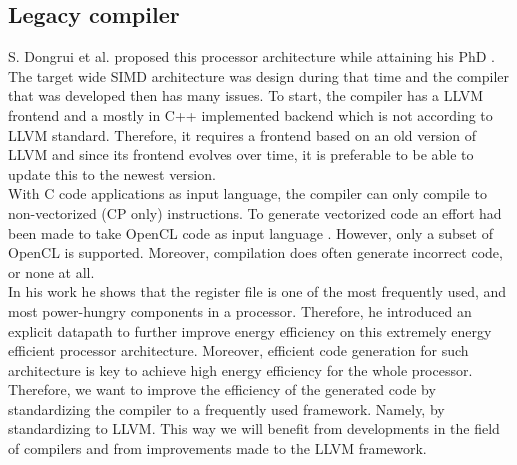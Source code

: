 

\subsection{Legacy compiler}\label{sec:legacy_comp}
S. Dongrui et al. proposed this processor architecture while attaining his PhD \cite{simd}. The target wide SIMD architecture was design during that time and the compiler that was developed then has many issues. To start, the compiler has a LLVM frontend and a mostly in C++ implemented backend which is not according to LLVM standard. Therefore, it requires a frontend based on an old version of LLVM and since its frontend evolves over time, it is preferable to be able to update this to the newest version. \\

With C code applications as input language, the compiler can only compile to non-vectorized (CP only) instructions. To generate vectorized code an effort had been made to take OpenCL code as input language \cite{dongrio2}. However, only a subset of OpenCL is supported. Moreover, compilation does often generate incorrect code, or none at all. \\


In his work he shows that the register file is one of the most frequently used, and most power-hungry components in a processor. Therefore, he introduced an explicit datapath to further improve energy efficiency on this extremely energy efficient processor architecture. Moreover, efficient code generation for such architecture is key to achieve high energy efficiency for the whole processor. Therefore, we want to improve the efficiency of the generated code by standardizing the compiler to a frequently used framework. Namely, by standardizing to LLVM. This way we will benefit from developments in the field of compilers and from improvements made to the LLVM framework.

